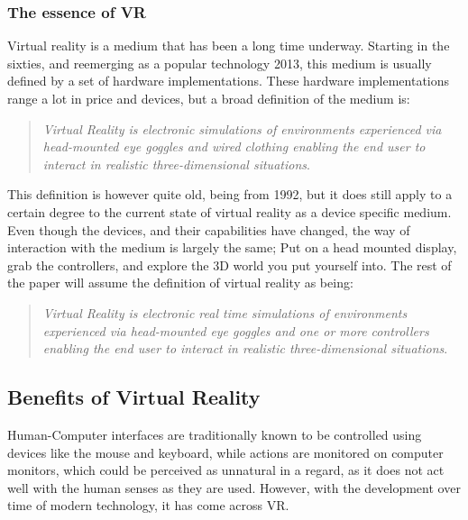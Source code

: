 		\subsubsection{The essence of VR}
		Virtual reality is a medium\cite{definingVirtualReality} that has been a long time underway. Starting in the sixties, and reemerging as a popular technology 2013, this medium is usually defined by a set of hardware implementations. These hardware implementations range a lot in price and devices, but a broad definition of the medium is:\\
		
		\begin{quote}
			\textit{Virtual Reality is electronic simulations of environments experienced via head-mounted eye goggles and wired clothing enabling the end user to interact in realistic three-dimensional situations}\cite{coates1992}.\\
		\end{quote}
		
		This definition is however quite old, being from 1992, but it does still apply to a certain degree to the current state of virtual reality as a device specific medium. Even though the devices, and their capabilities have changed, the way of interaction with the medium is largely the same; Put on a head mounted display, grab the controllers, and explore the 3D world you put yourself into. The rest of the paper will assume the definition of virtual reality as being:\\
		\begin{quote}
			\textit{Virtual Reality is electronic real time simulations of environments experienced via head-mounted eye goggles and one or more controllers enabling the end user to interact in realistic three-dimensional situations}\label{def:virtualRealityDefinition}.\\
		\end{quote}
	
	
	\subsection{Benefits of Virtual Reality}\label{sec:assessmentOfVR}
	Human-Computer interfaces are traditionally known to be controlled using devices like the mouse and keyboard, while actions are monitored on computer monitors, which could be perceived as unnatural in a regard, as it does not act well with the human senses as they are used. However, with the development over time of modern technology, it has come across VR. \\
	
